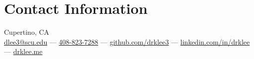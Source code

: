 \section{\sc Contact Information}
Cupertino, CA \\
\href{mailto:dlee3@scu.edu}{dlee3@scu.edu} ---
\href{tel:408-823-7288}{408-823-7288} ---
\href{https://github.com/drklee3}{github.com/drklee3} ---
\href{https://www.linkedin.com/in/drklee/}{linkedin.com/in/drklee} ---
\href{https://drklee.me}{drklee.me}


